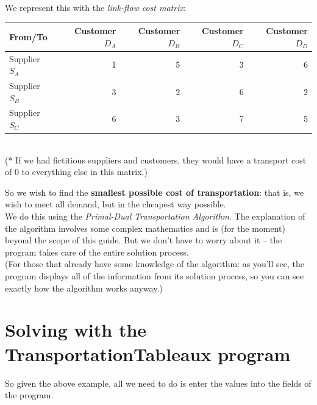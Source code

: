 \documentclass[a4paper,12pt]{article}
\begin{document}
We represent this with the \textit{link-flow cost matrix}:\\

\begin{tabular}{| l | r | r | r | r | }
\hline
From/To & Customer $D_A $ & Customer $D_B $ & Customer $D_C $ & Customer $D_D $ \\
\hline
Supplier $S_A$ & 1 & 5 & 3 & 6 \\
\hline
Supplier $S_B$ & 3 & 2 & 6 & 2 \\
\hline 
Supplier $S_C$ & 6 & 3 & 7 & 5  \\
\hline
\end{tabular}\\[6pt]

(* If we had fictitious suppliers and customers, they would have a transport cost of 0 to everything else in this matrix.)\\

\newpage

So we wish to find the \textbf{smallest possible cost of transportation}: that is, we wish to meet all demand, but in the cheapest way possible.\\

We do this using the \textit{Primal-Dual Transportation Algorithm}. The explanation of the algorithm involves some complex mathematics and is (for the moment) beyond the scope of this guide. But we don't have to worry about it -- the program takes care of the entire solution process.\\

(For those that already have some knowledge of the algorithm: as you'll see, the program displays all of the information from its solution process, so you can see exactly how the algorithm works anyway.)\\

\section*{Solving with the TransportationTableaux program}
So given the above example, all we need to do is enter the values into the fields of the program.
\end{document}

